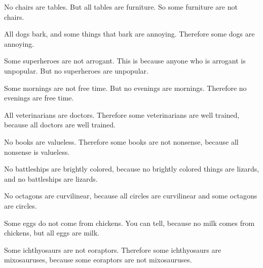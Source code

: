 \begin{exercises}

\item No chairs are tables. But all tables are furniture. So some furniture are not chairs.




\item All dogs bark, and some things that bark are annoying. Therefore some dogs are annoying.


\item Some superheroes are not arrogant. This is because anyone who is arrogant is unpopular. But no superheroes are unpopular.



\item Some mornings are not free time. But no evenings are mornings. Therefore no evenings are free time.


\item All veterinarians are doctors. Therefore some veterinarians are well trained, because all doctors are well trained.


\item No books are valueless. Therefore some books are not nonsense, because all nonsense is valueless.



 \item No battleships are brightly colored, because no brightly colored things are lizards, and no battleships are lizards.

\item No octagons are curvilinear, because all circles are curvilinear and some octagons are circles.


   \item Some eggs do not come from chickens. You can tell, because no milk comes from chickens, but all eggs are milk.


\item Some ichthyosaurs are not eoraptors. Therefore some ichthyosaurs are mixosauruses, because some eoraptors are not mixosauruses.

\end{exercises}

